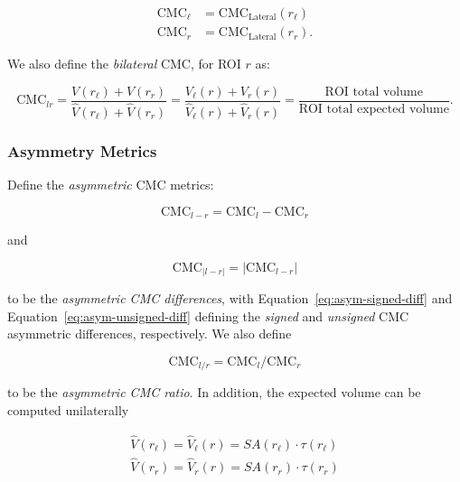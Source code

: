 \documentclass{article}
\begin{document}
\begin{align}
\label{eq:cmc-laterals}
\text{CMC}_{\ell} &= \text{CMC}_{\text{Lateral}}(r_{\ell}) \\
\text{CMC}_r &= \text{CMC}_{\text{Lateral}}(r_r).
\end{align}

We also define the \emph{bilateral} CMC, for ROI \(r\) as:

\begin{equation} \label{eq:cmc-bilateral}
\text{CMC}_{lr}
=\frac{V(r_{\ell}) + V(r_r)}{\hat{V}(r_{\ell}) + \hat{V}(r_r)}
=\frac{V_{\ell}(r) + V_r(r)}{\hat{V}_{\ell}(r) + \hat{V}_r(r)}
=\frac{\text{ROI total volume}}{\text{ROI total expected volume}}.
\end{equation}



\subsubsection{Asymmetry Metrics}

Define the \emph{asymmetric} CMC metrics:

\begin{equation} \label{eq:asym-signed-diff}
\text{CMC}_{l - r} = \text{CMC}_{l} - \text{CMC}_{r}
\end{equation}

and

\begin{equation} \label{eq:asym-unsigned-diff}
\text{CMC}_{|l - r|} = \lvert\text{CMC}_{l - r} \rvert
\end{equation}

to be the \emph{asymmetric CMC differences}, with
Equation~\ref{eq:asym-signed-diff} and Equation~\ref{eq:asym-unsigned-diff}
defining the \emph{signed} and \emph{unsigned} CMC asymmetric differences,
respectively. We also define

\begin{equation} \label{eq:asym-ratio}
\text{CMC}_{l / r} = \text{CMC}_{l} / \text{CMC}_{r}
\end{equation}

to be the \emph{asymmetric CMC ratio}.  In addition, the expected volume can
be computed unilaterally

\begin{align} \label{eq:ev-unilateral}
\hat{V}(r_{\ell}) = \hat{V}_{\ell}(r) = SA(r_{\ell}) \cdot \tau(r_{\ell}) \\
\hat{V}(r_r) = \hat{V}_r(r) = SA(r_{r}) \cdot \tau(r_r)
\end{align}
\end{document}
